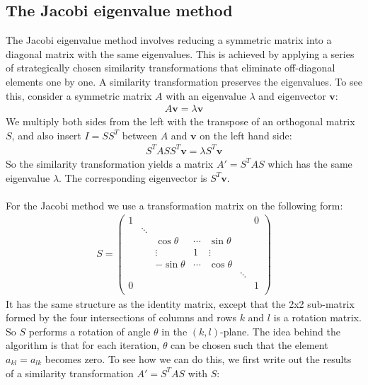 \documentclass{article}
\begin{document}
\subsection{The Jacobi eigenvalue method} \label{section:alg}
The Jacobi eigenvalue method involves reducing a symmetric matrix into a diagonal matrix with the same eigenvalues. This is achieved by applying a series of strategically chosen similarity transformations that eliminate off-diagonal elements one by one. A similarity transformation preserves the eigenvalues. To see this, consider a symmetric matrix $A$ with an eigenvalue $\lambda$ and eigenvector $\mathbf{v}$:
\begin{align*}
	A\mathbf{v} = \lambda\mathbf{v}
\end{align*}
We multiply both sides from the left with the transpose of an orthogonal matrix $S$, and also insert $I = SS^T$ between $A$ and $\mathbf{v}$ on the left hand side:
\begin{align*}
	S^TASS^T\mathbf{v} = \lambda S^T\mathbf{v}
\end{align*}
So the similarity transformation yields a matrix $A' = S^TAS$ which has the same eigenvalue $\lambda$. The corresponding eigenvector is $S^T\mathbf{v}$.\\\\
For the Jacobi method we use a transformation matrix on the following form:
\begin{align*}
	S = \left(\begin{array}{ccccccc}
		1 &&&&&& 0 \\
		& \ddots &&&&& \\
		&& \cos{\theta} & \cdots & \sin{\theta} && \\
		&& \vdots & 1 & \vdots && \\
		&& -\sin{\theta} & \cdots & \cos{\theta} && \\
		&&&&& \ddots & \\
		0 &&&&&& 1 \\
	\end{array}\right)
\end{align*}
It has the same structure as the identity matrix, except that the 2x2 sub-matrix formed by the four intersections of columns and rows $k$ and $l$ is a rotation matrix. So $S$ performs a rotation of angle $\theta$ in the $(k, l)$-plane. The idea behind the algorithm is that for each iteration, $\theta$ can be chosen such that the element $a_{kl} = a_{lk}$ becomes zero. To see how we can do this, we first write out the results of a similarity transformation $A' = {S}^TAS$ with $S$:
\end{document}
